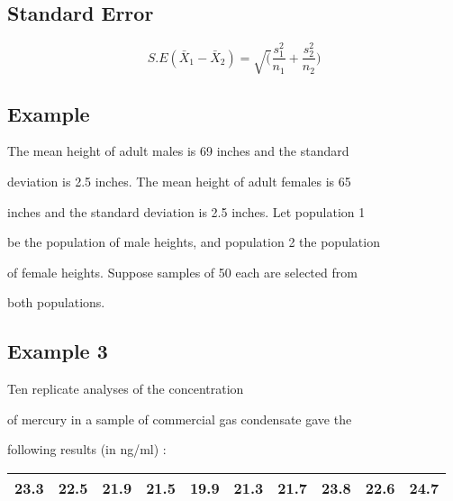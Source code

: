 \newpage

 



\subsection{Standard Error}

 

\begin{equation}

S.E(\bar{X}_{1}-\bar{X}_{2}) =

\sqrt(\frac{s^2_{1}}{n_{1}}+\frac{s^2_{2}}{n_{2}})

\end{equation}

 

\subsection{Example}

The mean height of adult males is 69 inches and the standard

deviation is 2.5 inches. The mean height of adult females is 65

inches and the standard deviation is 2.5 inches. Let population 1

be the population of male heights, and population 2 the population

of female heights. Suppose samples of 50 each are selected from

both populations.

 





\subsection{Example 3} Ten replicate analyses of the concentration

of mercury in a sample of commercial gas condensate gave the

following results (in ng/ml) :

 

\begin{tabular}{|c|c|c|c|c|c|c|c|c|c|}

  \hline

23.3 & 22.5 & 21.9 & 21.5 & 19.9 & 21.3 & 21.7 & 23.8 & 22.6 &

24.7\\

  \hline

\end{tabular}

